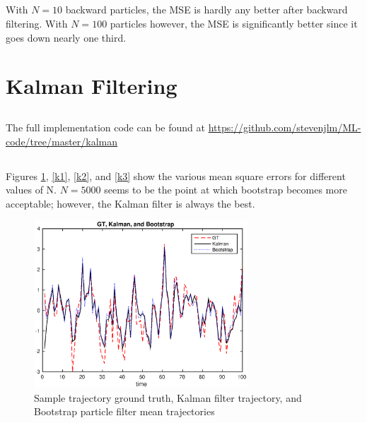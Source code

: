 \documentclass[11pt, english]{article}
\begin{document}
\subsection{}

With $N=10$ backward particles, the MSE is hardly any better after backward filtering. With $N=100$ particles however, the MSE is significantly better since it goes down nearly one third.

\section{Kalman Filtering}

\subsection{}

The full implementation code can be found at \url{https://github.com/stevenjlm/ML-code/tree/master/kalman}

\subsection{}

Figures \ref{bk}, \ref{k1}, \ref{k2}, and \ref{k3} show the various mean square errors for different values of N. $N=5000$ seems to be the point at which bootstrap becomes more acceptable; however, the Kalman filter is always the best.

\begin{figure}[h]
  
  \centering
    \includegraphics[width=80mm]{./kfigs/001_a3.eps}
    \caption{Sample trajectory ground truth, Kalman filter trajectory, and Bootstrap particle filter mean trajectories}
    \label{bk}
\end{figure}
\end{document}
